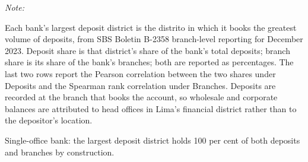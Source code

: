 \begin{table}[!h]
\begin{threeparttable}
\begin{tablenotes}
\item \textit{Note:} 
\item Each bank's largest deposit district is the distrito in which it books the greatest volume of deposits, from SBS Boletin B-2358 branch-level reporting for December 2023. Deposit share is that district's share of the bank's total deposits; branch share is its share of the bank's branches; both are reported as percentages. The last two rows report the Pearson correlation between the two shares under Deposits and the Spearman rank correlation under Branches. Deposits are recorded at the branch that books the account, so wholesale and corporate balances are attributed to head offices in Lima's financial district rather than to the depositor's location.
\item[a] Single-office bank: the largest deposit district holds 100 per cent of both deposits and branches by construction.
\end{tablenotes}
\end{threeparttable}
\end{table}
